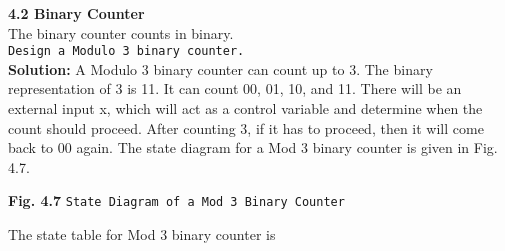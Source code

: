 \documentclass{article}
\begin{document}
  \vspace*{0.5cm}
  \textbf{4.2 Binary Counter}\\

  \vspace*{0.2cm}
  The binary counter counts in binary.\\

   \vspace*{0.2cm}
  \hspace*{0.1cm} \texttt{Design a Modulo 3 binary counter.}\\

  \textbf{Solution:} A Modulo 3 binary counter can count up to 3. The binary representation of 3 is 11. It can count
00, 01, 10, and 11. There will be an external input x, which will act as a control variable and determine
when the count should proceed. After counting 3, if it has to proceed, then it will come back to 00 again.
The state diagram for a Mod 3 binary counter is given in Fig. 4.7.\\

\begin{center}
\end{center}
\begin{center}
\textbf{Fig. 4.7} \hspace*{0.3cm} \texttt{State Diagram of a Mod 3 Binary Counter}
\end{center}

The state table for Mod 3 binary counter is
\end{document}

